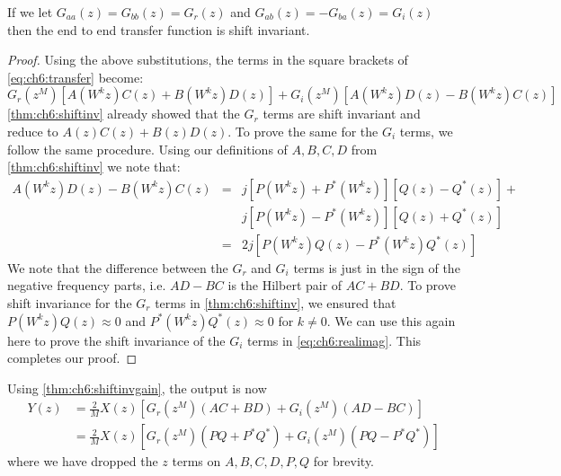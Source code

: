\begin{theorem}\label{thm:ch6:shiftinvgain}
  If we let $G_{aa}(z) = G_{bb}(z) = G_r(z)$ and $G_{ab}(z) = -G_{ba}(z) = G_i(z)$
  then the end to end transfer function is shift invariant. 
\end{theorem}
\begin{proof}
  Using the above substitutions, the terms in the square brackets of
  \eqref{eq:ch6:transfer} become:
  \begin{equation}\label{eq:ch6:realimag}
    G_r(z^M)\left[A(W^kz)C(z) + B(W^kz)D(z)\right] + G_i(z^M)\left[A(W^kz)D(z) - B(W^kz)C(z)\right]
  \end{equation}
  \autoref{thm:ch6:shiftinv} already showed that the $G_r$ terms are shift
  invariant and reduce to $A(z)C(z) + B(z)D(z)$. To prove the same for the $G_i$
  terms, we follow the same procedure. Using our definitions of $A, B, C, D$
  from \autoref{thm:ch6:shiftinv} we note that:
  \begin{eqnarray}
    A(W^kz)D(z) - B(W^kz)C(z) &=& j\left[P(W^kz) + P^*(W^kz)\right]\left[Q(z) -Q^*(z)\right] +\\
                              &&j\left[P(W^kz) -P^*(W^kz)\right]\left[Q(z) + Q^*(z)\right] \\
                              &=& 2j\left[P(W^kz)Q(z) - P^*(W^kz)Q^*(z)\right]
  \end{eqnarray}
  We note that the difference
  between the $G_r$ and $G_i$ terms is just in the sign of the negative
  frequency parts, i.e. $AD - BC$ is the Hilbert pair of $AC+BD$. To prove shift
  invariance for the $G_r$ terms in \autoref{thm:ch6:shiftinv}, we ensured that
  $P(W^kz)Q(z) \approx 0$ and $P^*(W^kz)Q^*(z) \approx 0$ for $k\neq 0$. We can
  use this again here to prove the shift invariance of the $G_i$ terms in
  \eqref{eq:ch6:realimag}. This completes our proof.
\end{proof}

Using \autoref{thm:ch6:shiftinvgain}, the output is now
\begin{align}
  Y(z) &= \frac{2}{M} X(z) \left[G_r(z^{M}) \left(AC + BD\right)
  + G_i(z^{M}) \left(AD - BC\right) \right] \\
  &= \frac{2}{M}X(z)\left[G_r(z^{M}) \left(PQ + P^*Q^*\right)
  + G_i(z^{M}) \left(PQ - P^*Q^*\right) \right]  \label{eq:ch6:end2end}
\end{align}
where we have dropped the $z$ terms on $A, B, C, D, P, Q$ for brevity.


